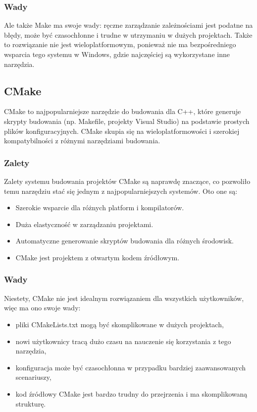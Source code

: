\subsubsection{Wady}
Ale także Make ma swoje wady: ręczne zarządzanie zależnościami jest podatne na błędy, może być czasochłonne i trudne w utrzymaniu w dużych projektach. Także to rozwiązanie nie jest wieloplatformowym, ponieważ nie ma bezpośredniego wsparcia tego systemu w Windows, gdzie najczęściej są wykorzystane inne narzędzia.

\subsection{CMake}
CMake to najpopularniejsze narzędzie do budowania dla C++, które generuje skrypty budowania (np. Makefile, projekty Visual Studio) na podstawie prostych plików konfiguracyjnych. CMake skupia się na wieloplatformowości i szerokiej kompatybilności z różnymi narzędziami budowania.

\subsubsection{Zalety}
Zalety systemu budowania projektów CMake są naprawdę znaczące, co pozwoliło temu narzędziu stać się jednym z najpopularniejszych systemów. Oto one są:

\begin{itemize}
    \item Szerokie wsparcie dla różnych platform i kompilatorów.
    \item Duża elastyczność w zarządzaniu projektami.
    \item Automatyczne generowanie skryptów budowania dla różnych środowisk.
    \item CMake jest projektem z otwartym kodem źródłowym.
\end{itemize}

\subsubsection{Wady}
Niestety, CMake nie jest idealnym rozwiązaniem dla wszystkich użytkowników, więc ma ono swoje wady:

\begin{itemize}
    \item pliki CMakeLists.txt mogą być skomplikowane w dużych projektach,
    \item nowi użytkownicy tracą dużo czasu na nauczenie się korzystania z tego narzędzia,
    \item konfiguracja może być czasochłonna w przypadku bardziej zaawansowanych scenariuszy,
    \item kod źródłowy CMake jest bardzo trudny do przejrzenia i ma skomplikowaną strukturę.
\end{itemize}

